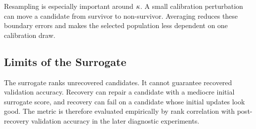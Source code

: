 Resampling is especially important around $\kappa$. A small calibration perturbation can move a candidate from survivor to non-survivor. Averaging reduces these boundary errors and makes the selected population less dependent on one calibration draw.

\subsection{Limits of the Surrogate}

The surrogate ranks unrecovered candidates. It cannot guarantee recovered validation accuracy. Recovery can repair a candidate with a mediocre initial surrogate score, and recovery can fail on a candidate whose initial updates look good. The metric is therefore evaluated empirically by rank correlation with post-recovery validation accuracy in the later diagnostic experiments.
